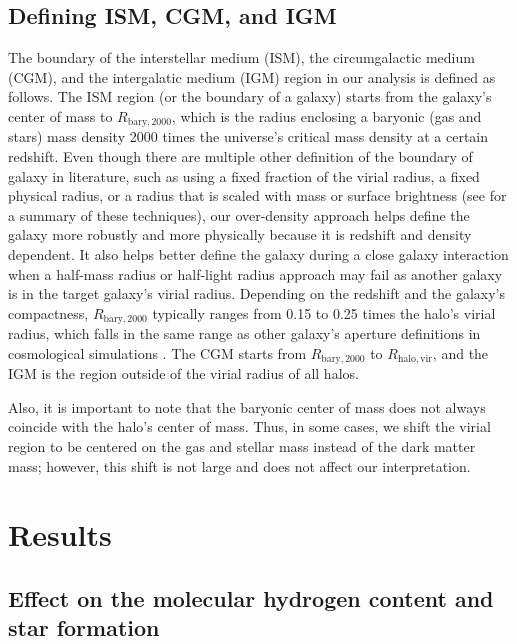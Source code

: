 \documentclass[linenumbers, twocolumn]{aastex631}
\begin{document}
\subsection{Defining ISM, CGM, and IGM}

The boundary of the interstellar medium (ISM), the circumgalactic medium (CGM), and the intergalatic medium (IGM) region in our analysis is defined as follows. The ISM region (or the boundary of a galaxy) starts from the galaxy's center of mass to $R_{\mathrm{bary}, 2000}$, which is the radius enclosing a baryonic (gas and stars) mass density 2000 times the universe's critical mass density at a certain redshift. Even though there are multiple other definition of the boundary of galaxy in literature, such as using a fixed fraction of the virial radius, a fixed physical radius, or a radius that is scaled with mass or surface brightness (see \citealp{Stevens+2014} for a summary of these techniques), our over-density approach helps define the galaxy more robustly and more physically because it is redshift and density dependent. It also helps better define the galaxy during a close galaxy interaction when a half-mass radius or half-light radius approach may fail as another galaxy is in the target galaxy's virial radius. Depending on the redshift and the galaxy's compactness, $R_{\mathrm{bary}, 2000}$ typically ranges from 0.15 to 0.25 times the halo's virial radius, which falls in the same range as other galaxy's aperture definitions in cosmological simulations \citep{Stevens+2014}. The CGM starts from $R_{\mathrm{bary}, 2000}$ to $R_{\mathrm{halo,vir}}$, and the IGM is the region outside of the virial radius of all halos.

Also, it is important to note that the baryonic center of mass does not always coincide with the halo's center of mass. Thus, in some cases, we shift the virial region to be centered on the gas and stellar mass instead of the dark matter mass; however, this shift is not large and does not affect our interpretation.    
 
\section{Results}
\label{sec:result}

\subsection{Effect on the molecular hydrogen content and star formation}
\label{subsect:effect_on_sf}
\end{document}
